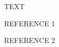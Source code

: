\documentclass[journal abbreviation, manuscript]{copernicus}
\begin{document}
\appendixfigures  %

\appendixtables   %







\begin{acknowledgements}
TEXT
\end{acknowledgements}






\begin{thebibliography}{}

REFERENCE 1

REFERENCE 2

\end{thebibliography}







\end{document}
